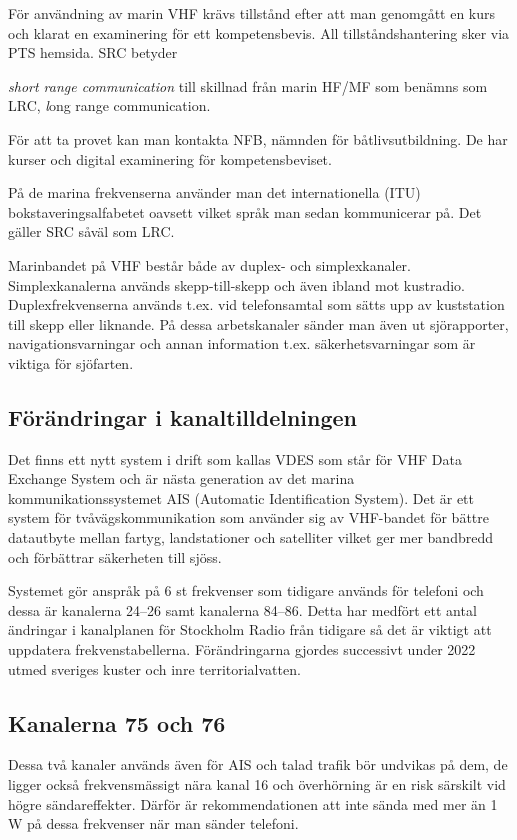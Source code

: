 För användning av marin VHF krävs tillstånd efter att man genomgått en kurs och
klarat en examinering för ett kompetensbevis. All tillståndshantering sker via
PTS hemsida. SRC betyder {\textit{short range communication }till skillnad från
marin HF/MF som benämns som LRC, {\textit long range communication}.

För att ta provet kan man kontakta NFB, nämnden för båtlivsutbildning. De har
kurser och digital examinering för kompetensbeviset.

På de marina frekvenserna använder man det internationella (ITU)
bokstaveringsalfabetet oavsett vilket språk man sedan kommunicerar på. Det
gäller SRC såväl som LRC.

Marinbandet på VHF består både av duplex- och simplexkanaler. Simplexkanalerna
används skepp-till-skepp och även ibland mot kustradio. Duplexfrekvenserna
används t.ex. vid telefonsamtal som sätts upp av kuststation till skepp eller
liknande. På dessa arbetskanaler sänder man även ut sjörapporter,
navigationsvarningar och annan information t.ex. säkerhetsvarningar som är
viktiga för sjöfarten.

\subsection{Förändringar i kanaltilldelningen}

Det finns ett nytt system i drift som kallas VDES som står för VHF Data Exchange
System och är nästa generation av det marina kommunikationssystemet AIS
(Automatic Identification System). Det är ett system för tvåvägskommunikation
som använder sig av VHF-bandet för bättre datautbyte mellan fartyg,
landstationer och satelliter vilket ger mer bandbredd och förbättrar säkerheten
till sjöss.

Systemet gör anspråk på 6 st frekvenser som tidigare används för telefoni och
dessa är kanalerna 24--26 samt kanalerna 84--86. Detta har medfört ett antal
ändringar i kanalplanen för Stockholm Radio från tidigare så det är viktigt att
uppdatera frekvenstabellerna. Förändringarna gjordes successivt under 2022 utmed
sveriges kuster och inre territorialvatten.

\subsection{Kanalerna 75 och 76}

Dessa två kanaler används även för AIS och talad trafik bör undvikas på dem, de
ligger också frekvensmässigt nära kanal 16 och överhörning är en risk särskilt
vid högre sändareffekter. Därför är rekommendationen att inte sända med mer än
1\,W på dessa frekvenser när man sänder telefoni.

}
